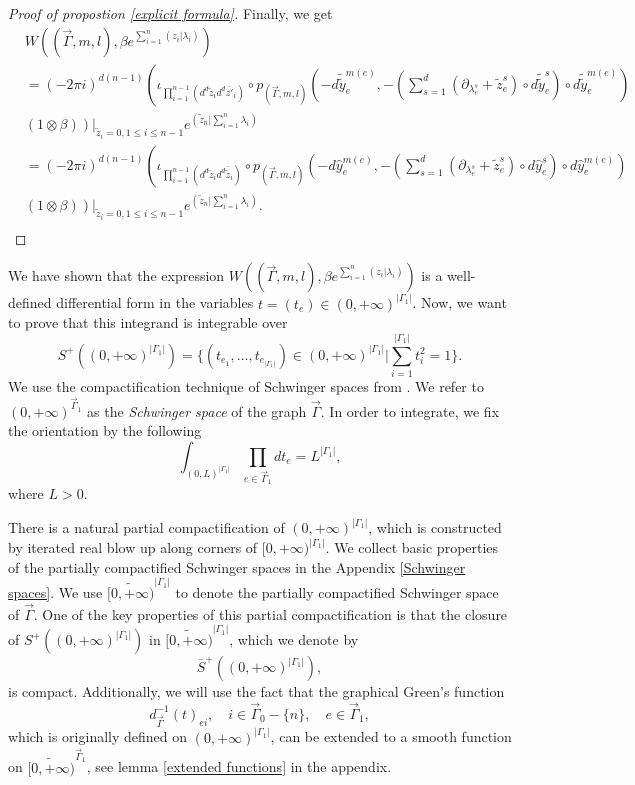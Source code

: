 \documentclass[11pt]{amsart}
\theoremstyle{definition}
\theoremstyle{remark}
\numberwithin{equation}{section}
\begin{document}
\begin{proof}[Proof of propostion \ref{explicit formula}]
    Finally, we get
    \begin{align*}
        &W((\vec{\Gamma},m,l),\beta e^{\sum\limits_{i=1}^{n}(z_{i}|\lambda_{i})})\\
        &=(-2\pi i)^{d(n-1)}\left(
        \iota_{\prod_{i=1}^{n-1}(d^{d}\tilde{z}_{i}d^{d}\bar{z'}_{i})}\circ p_{(\vec{\Gamma},m,l)}(-d\tilde{\tilde{y}}_{e}^{m(e)},-(\sum_{s=1}^{d}(\partial_{\lambda_{e}^{s}}+\tilde{z}_{e}^{s})\circ d\tilde{\tilde{y}}_{e}^{s})\circ d\tilde{\tilde{y}}_{e}^{m(e)})
        \right.\\
        &\left.\left.(1\otimes \beta)\right)\right|_{\tilde{z}_{i}=0,1\leq i\leq n-1} e^{(\tilde{z}_{n}|\sum\limits_{i=1}^{n}\lambda_{i})}\\
        &=(-2\pi i)^{d(n-1)}\left(
        \iota_{\prod_{i=1}^{n-1}(d^{d}\tilde{z}_{i}d^{d}\bar{\tilde{z}}_{i})}\circ p_{(\vec{\Gamma},m,l)}(-d\hat{y}_{e}^{m(e)},-(\sum_{s=1}^{d}(\partial_{\lambda_{e}^{s}}+\tilde{z}_{e}^{s})\circ d\hat{y}_{e}^{s})\circ d\hat{y}_{e}^{m(e)})
        \right.\\
        &\left.\left.(1\otimes \beta)\right)\right|_{\tilde{z}_{i}=0,1\leq i\leq n-1} e^{(\tilde{z}_{n}|\sum\limits_{i=1}^{n}\lambda_{i})}.\\
    \end{align*}
\end{proof}

We have shown that the expression $W((\vec{\Gamma},m,l),\beta e^{\sum\limits_{i=1}^{n}(z_{i}|\lambda_{i})})$ is a
well-defined differential form in the variables $t = (t_e) \in (0,+\infty)^{|\Gamma_1|}$.
Now, we want to prove that this integrand is integrable over
$$
S^{+}((0,+\infty)^{|\Gamma_{1}|})=\{(t_{e_{1}},\dots,t_{e_{|\Gamma_{1}|}})\in(0,+\infty)^{|\Gamma_{1}|}|\sum_{i=1}^{|\Gamma_{1}|}t_{i}^{2}=1\}.
$$
We use the compactification technique of Schwinger spaces from \cite{Wang:2024tjf,wang2024feynman}.
We refer to $(0,+\infty)^{\vec{\Gamma}_{1}}$ as the \textit{Schwinger space} of the graph $\vec{\Gamma}$.
In order to integrate, we fix the orientation by the following
    $$
    \int_{(0,L)^{|\Gamma_{1}|}}\prod_{e\in\vec{\Gamma}_{1}}dt_{e}=L^{|\Gamma_{1}|},
    $$
    where $L>0$.

There is a natural partial compactification of $(0,+\infty)^{|\Gamma_{1}|}$, which is constructed by iterated real
blow up along corners of $[0,+\infty)^{|\Gamma_{1}|}$. We collect basic properties of the partially compactified
Schwinger spaces in the Appendix \ref{Schwinger spaces}. We use $\widetilde{[0,+\infty)}^{|\Gamma_{1}|}$ to denote the partially compactified Schwinger space of $\vec{\Gamma}$.
One of the key properties of this partial compactification is that the closure of $S^{+}((0,+\infty)^{|\Gamma_{1}|})$
in $\widetilde{[0,+\infty)}^{|\Gamma_{1}|}$, which we denote by
    $$
    \bar{S}^{+}((0,+\infty)^{|\Gamma_{1}|}),
    $$
    is compact.
    Additionally, we will use the fact that the graphical Green's function
    \[
      d^{-1}_{\vec{\Gamma}}(t)_{ei}, \quad i\in \vec{\Gamma}_{0}-\{n\},\quad e\in \vec{\Gamma}_{1} ,
    \]
    which is originally defined on $(0,+\infty)^{|\Gamma_1|}$, can be extended to a smooth function on $\widetilde{[0,
    +\infty)}^{\vec{\Gamma}_{1}}$, see lemma \ref{extended functions} in the appendix.
\end{document}

